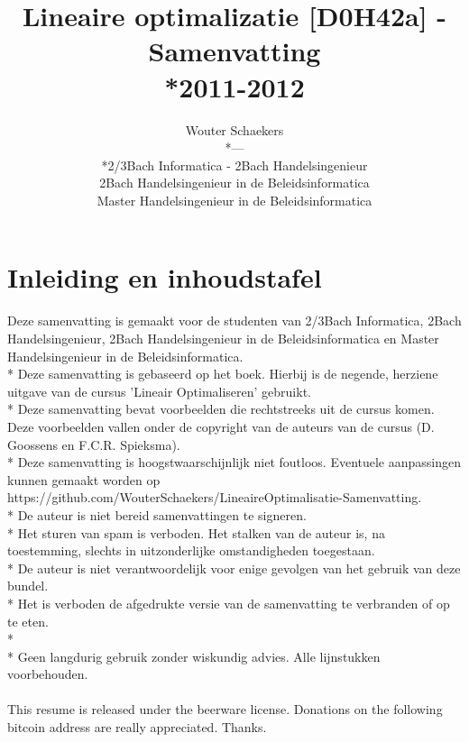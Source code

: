 \documentclass[10pt]{article}
\title{Lineaire optimalizatie [D0H42a] - Samenvatting\\*2011-2012}
\author{Wouter Schaekers\\*---\\*2/3Bach Informatica - 2Bach Handelsingenieur\\2Bach Handelsingenieur in de Beleidsinformatica\\Master Handelsingenieur in de Beleidsinformatica}
\begin{document}
\maketitle
\setcounter{section}{-1}
\setcounter{page}{0}
\renewcommand{\contentsname}{Inhoudstafel}
\setcounter{tocdepth}{3}
\tableofcontents
\clearpage
\section{Inleiding en inhoudstafel}
Deze samenvatting is gemaakt voor de studenten van 2/3Bach Informatica, 2Bach Handelsingenieur, 2Bach Handelsingenieur in de Beleidsinformatica en Master Handelsingenieur in de Beleidsinformatica.\\*
Deze samenvatting is gebaseerd op het boek. Hierbij is de negende, herziene uitgave van de cursus 'Lineair Optimaliseren' gebruikt.\\*
Deze samenvatting bevat voorbeelden die rechtstreeks uit de cursus komen. Deze voorbeelden vallen onder de copyright van de auteurs van de cursus (D. Goossens en F.C.R. Spieksma).\\*
Deze samenvatting is hoogstwaarschijnlijk niet foutloos. Eventuele aanpassingen kunnen gemaakt worden op https://github.com/WouterSchaekers/LineaireOptimalisatie-Samenvatting.\\*
De auteur is niet bereid samenvattingen te signeren.\\*
Het sturen van spam is verboden. Het stalken van de auteur is, na toestemming, slechts in uitzonderlijke omstandigheden toegestaan.\\*
De auteur is niet verantwoordelijk voor enige gevolgen van het gebruik van deze bundel.\\*
Het is verboden de afgedrukte versie van de samenvatting te verbranden of op te eten.\\*\\*
Geen langdurig gebruik zonder wiskundig advies. Alle lijnstukken voorbehouden.\\\\
This resume is released under the beerware license. Donations on the following bitcoin address are really appreciated. Thanks.\\\\\\\\\\\\\\\\\\\\\\\\\\\\\\\\\\\\\\\\\\
\end{document}
